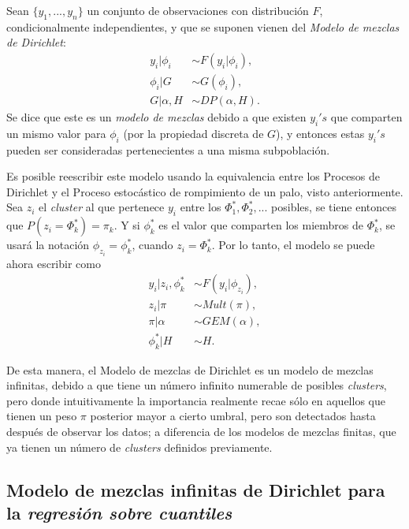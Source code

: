 Sean $\{y_1,...,y_n\}$ un conjunto de observaciones con distribuci\'on $F$, condicionalmente independientes, y que se suponen vienen del \textit{Modelo de mezclas de Dirichlet}:
\begin{equation*}
\begin{aligned}
   y_i | \phi_i &\sim F(y_i | \phi_i), \\
   \phi_i | G &\sim G(\phi_i), \\
   G | \alpha, H &\sim DP(\alpha,H).
\end{aligned}
\end{equation*}
Se dice que este es un \textit{modelo de mezclas} debido a que existen $y_i's$ que comparten un mismo valor para $\phi_i$ (por la propiedad discreta de $G$), y entonces estas $y_i's$ pueden ser consideradas pertenecientes a una misma subpoblaci\'on.

Es posible reescribir este modelo usando la equivalencia entre los Procesos de Dirichlet y el Proceso estoc\'astico de rompimiento de un palo, visto anteriormente. Sea $z_i$ el \textit{cluster} al que pertenece $y_i$ entre los $\Phi_1^*,\Phi_2^*,...$ posibles, se tiene entonces que $P(z_i = \Phi_k^*) = \pi_k$. Y si $\phi_k^*$ es el valor que comparten los miembros de $\Phi_k^*$, se usar\'a la notaci\'on $\phi_{z_i} = \phi_k^*$, cuando $z_i = \Phi_k^*$. Por lo tanto, el modelo se puede ahora escribir como
\begin{equation*}
\begin{aligned}
   y_i | z_i, \phi_k^* &\sim F(y_i | \phi_{z_i}), \\
   z_i | \pi &\sim Mult(\pi), \\
   \pi | \alpha &\sim GEM(\alpha), \\
   \phi_k^* | H &\sim H.
\end{aligned}
\end{equation*}

De esta manera, el Modelo de mezclas de Dirichlet es un modelo de mezclas infinitas, debido a que tiene un n\'umero infinito numerable de posibles \textit{clusters}, pero donde intuitivamente la importancia realmente recae s\'olo en aquellos que tienen un peso $\pi$ posterior mayor a cierto umbral, pero son detectados hasta despu\'es de observar los datos; a diferencia de los modelos de mezclas finitas, que ya tienen un n\'umero de \textit{clusters} definidos previamente.

\subsection{Modelo de mezclas infinitas de Dirichlet para la \textit{regresi\'on sobre cuantiles}}

